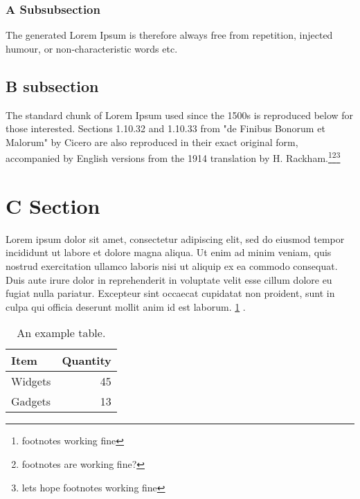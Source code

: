 \subsubsection{A Subsubsection}
The generated Lorem Ipsum is therefore always free from repetition, injected humour, or non-characteristic words etc.

\subsection{B subsection}
The standard chunk of Lorem Ipsum used since the 1500s is reproduced below for those interested. Sections 1.10.32 and 1.10.33 from "de Finibus Bonorum et Malorum" by Cicero are also reproduced in their exact original form, accompanied by English versions from the 1914 translation by H. Rackham.\footnote{footnotes working fine}\footnote{footnotes are working fine?}\footnote{lets hope footnotes working fine}

\section{C Section}
Lorem ipsum dolor sit amet, consectetur adipiscing elit, sed do eiusmod tempor incididunt ut labore et dolore magna aliqua. Ut enim ad minim veniam, quis nostrud exercitation ullamco laboris nisi ut aliquip ex ea commodo consequat. Duis aute irure dolor in reprehenderit in voluptate velit esse cillum dolore eu fugiat nulla pariatur. Excepteur sint occaecat cupidatat non proident, sunt in culpa qui officia deserunt mollit anim id est laborum. \ref{tab:widgets} \cite{One, Two, Three}.

\begin{table}[!htbp]
    \centering
    \caption{\label{tab:widgets}An example table.}
    \begin{tabular}{l|r}
        Item & Quantity \\\hline
        Widgets & 45 \\
        Gadgets & 13
    \end{tabular}
\end{table}